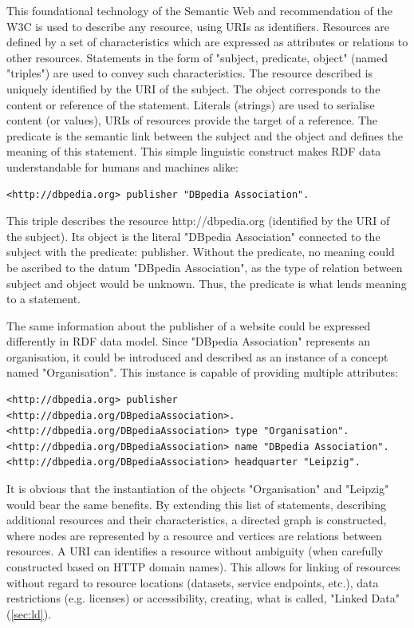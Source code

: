 \documentclass[a4paper,english,twoside,BCOR1.5cm,headsepline,DIV12,appendixprefix,final,12pt]{scrbook}
\begin{document}
This foundational technology of the Semantic Web and recommendation of the W3C \cite{RDF11} is used to describe any resource, using URIs as identifiers. Resources are defined by a set of characteristics which are expressed as attributes or relations to other resources. Statements in the form of "subject, predicate, object" (named "triples") are used to convey such characteristics. The resource described is uniquely identified by the URI of the subject. The object corresponds to the content or reference of the statement. Literals (strings) are used to serialise content (or values), URIs of resources provide the target of a reference. The predicate is the semantic link between the subject and the object and defines the meaning of this statement.
This simple linguistic construct makes RDF data understandable for humans and machines alike:

\begin{lstlisting}[language=ttl, label=lst:triple,linewidth=\columnwidth,breaklines=true]
<http://dbpedia.org> publisher "DBpedia Association".
\end{lstlisting}

This triple describes the resource http://dbpedia.org (identified by the URI of the subject). Its object is the literal "DBpedia Association" connected to the subject with the predicate: publisher. Without the predicate, no meaning could be ascribed to the datum "DBpedia Association", as the type of relation between subject and object would be unknown. Thus, the predicate is what lends meaning to a statement.

The same information about the publisher of a website could be expressed differently in RDF data model. Since "DBpedia Association" represents an organisation, it could be introduced and described as an instance of a concept named "Organisation". This instance is capable of providing multiple attributes:

\begin{lstlisting}[language=ttl, label=lst:graph,linewidth=\columnwidth,breaklines=true]
<http://dbpedia.org> publisher <http://dbpedia.org/DBpediaAssociation>.
<http://dbpedia.org/DBpediaAssociation> type "Organisation".
<http://dbpedia.org/DBpediaAssociation> name "DBpedia Association".
<http://dbpedia.org/DBpediaAssociation> headquarter "Leipzig". 
\end{lstlisting}

It is obvious that the instantiation of the objects "Organisation" and "Leipzig" would bear the same benefits. 
By extending this list of statements, describing additional resources and their characteristics, a directed graph is constructed, where nodes are represented by a resource and vertices are relations between resources. A URI can identifies a resource without ambiguity (when carefully constructed based on HTTP domain names). This allows for linking of resources without regard to resource locations (datasets, service endpoints, etc.), data restrictions (e.g. licenses) or accessibility, creating, what is called, "Linked Data" (\cref{sec:ld}).
\end{document}
